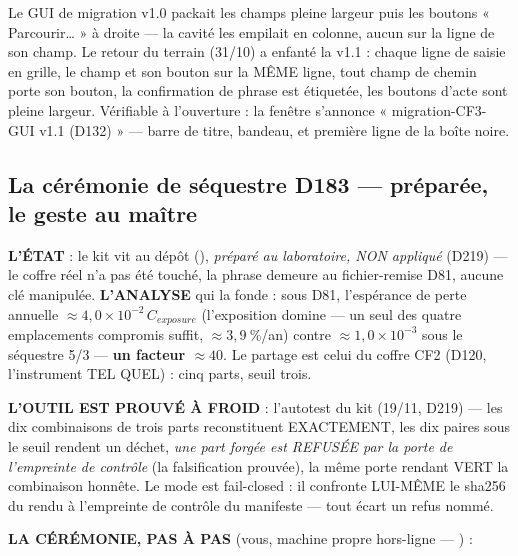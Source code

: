 \begin{terrain}
Le GUI de migration v1.0 packait les champs pleine largeur puis les boutons
« Parcourir\ldots{} » à droite — la cavité les empilait en colonne, aucun sur la
ligne de son champ. Le retour du terrain (31/10) a enfanté la v1.1 : chaque ligne
de saisie en grille, le champ et son bouton sur la MÊME ligne, tout champ de chemin
porte son bouton, la confirmation de phrase est étiquetée, les boutons d'acte sont
pleine largeur. Vérifiable à l'ouverture : la fenêtre s'annonce
« migration-CF3-GUI v1.1 (D132) » — barre de titre, bandeau, et première ligne de la
boîte noire.
\end{terrain}

\subsection{La cérémonie de séquestre D183 — préparée, le geste au maître}\label{sec:cerd183}

\textbf{L'ÉTAT} : le kit vit au dépôt (),
\emph{préparé au laboratoire, NON appliqué} (D219) — le coffre réel n'a pas
été touché, la phrase demeure au fichier-remise D81, aucune clé manipulée.
\textbf{L'ANALYSE} qui la fonde : sous D81, l'espérance de perte annuelle
$\approx 4{,}0 \times 10^{-2}\,C_{exposure}$ (l'exposition domine — un seul
des quatre emplacements compromis suffit, $\approx 3{,}9~\%$/an) contre
$\approx 1{,}0 \times 10^{-3}$ sous le séquestre 5/3 — \textbf{un facteur
$\approx 40$}. Le partage est celui du coffre CF2 (D120, l'instrument
 TEL QUEL) : cinq parts, seuil trois.

\textbf{L'OUTIL EST PROUVÉ À FROID} : l'autotest du kit (19/11, D219) — les
dix combinaisons de trois parts reconstituent EXACTEMENT, les dix paires
sous le seuil rendent un déchet, \emph{une part forgée est REFUSÉE par la
porte de l'empreinte de contrôle} (la falsification prouvée), la même porte
rendant VERT la combinaison honnête. Le mode  est
fail-closed : il confronte LUI-MÊME le sha256 du rendu à l'empreinte de
contrôle du manifeste — tout écart un refus nommé.

\textbf{LA CÉRÉMONIE, PAS À PAS} (vous, machine propre hors-ligne —
) :

